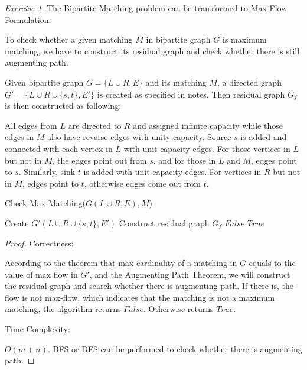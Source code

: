 \documentclass[a4paper,10pt,twoside]{article}
\theoremstyle{plain}
\theoremstyle{definition}
\theoremstyle{remark}
\newtheorem{exercise}{Exercise}
\begin{document}
\begin{exercise}
The Bipartite Matching problem can be transformed to Max-Flow Formulation.

To check whether a given matching $M$ in bipartite graph $G$ is maximum matching, we have to construct its residual graph and check whether there is still augmenting path.

Given bipartite graph $G = \{L\cup R, E\}$ and its matching $M$, a directed graph $G' = \{L\cup R \cup\{s, t\}, E'\}$ is created as specified in notes. Then residual graph $G_f$ is then constructed as following:

All edges from $L$ are directed to $R$ and assigned infinite capacity while those edges in $M$ also have reverse edges with unity capacity. Source $s$ is added and connected with each vertex in $L$ with unit capacity edges. For those vertices in $L$ but not in $M$, the edges point out from $s$, and for those in $L$ and $M$, edges point to $s$. Similarly, sink $t$ is added with unit capacity edges. For vertices in $R$ but not in $M$, edges point to $t$, otherwise edges come out from $t$.

\begin{algorithm}[h]
	\caption{Check Max Matching($G(L\cup R, E), M$)}
	Create $G'(L\cup R \cup\{s, t\}, E')$\;
	Construct residual graph $G_f$ \;
		{\Return $False$}
	\Else
		{\Return $True$}

\end{algorithm}

\begin{proof}
Correctness:

According to the theorem that max cardinality of a matching in $G$ equals to the value of max flow in $G'$, and the Augmenting Path Theorem, we will construct the residual graph and search whether there is augmenting path. If there is, the flow is not max-flow, which indicates that the matching is not a maximum matching, the algorithm returns $False$. Otherwise returns $True$.

Time Complexity:

$O(m+n)$.
BFS or DFS can be performed to check whether there is augmenting path.
\end{proof}

\end{exercise}
\end{document}
